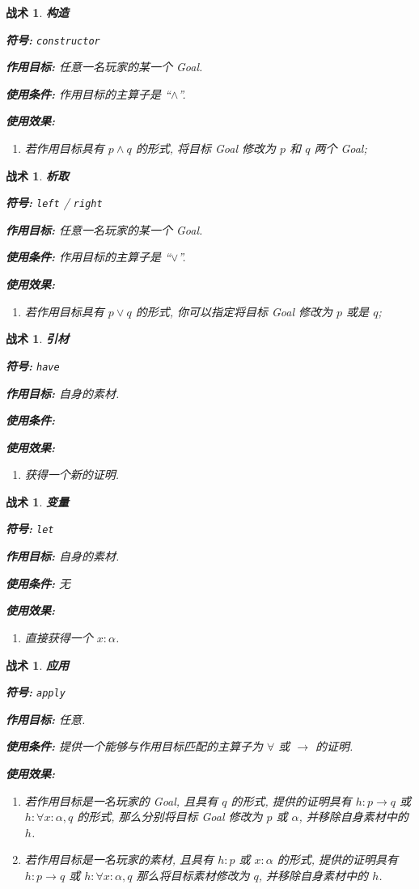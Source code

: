 \documentclass[UTF8]{ctexart}
\DeclareMathOperator{\0}{\mathbf{0}}                    %
\newcommand{\<}{\langle}
\renewcommand{\>}{\rangle}                              %
\newenvironment{thm_box}{
    \begin{tcolorbox}[enhanced, colback=thm_blue2, boxrule=0pt, frame hidden,
        borderline west={0.7mm}{0.1mm}{thm_blue1},breakable]
    }
    {\end{tcolorbox}}
\theoremstyle{MyStyle} %
\newtheorem{mytactic}[definition]{战术}
\newenvironment{tactic}[4]
{
    \begin{thm_box}
        \begin{mytactic}
            \textbf{#1}

            \textbf{符号: }#2

            \textbf{作用目标: }#3

            \textbf{使用条件: }#4

            \textbf{使用效果: }
}
{
        \end{mytactic}
    \end{thm_box}
}
\newcommand*{\lean}[1]{\texttt{\color{blue}#1}}
\begin{document}
        \begin{tactic}
            {构造}
            {\lean{constructor}}
            {任意一名玩家的某一个 Goal. }
            {作用目标的主算子是 ``$\land$''. }
            \begin{enumerate}
                \item 若作用目标具有 $p \land q$ 的形式, 将目标 Goal 修改为 $p$ 和 $q$ 两个 Goal; 
            \end{enumerate}
        \end{tactic}

        \begin{tactic}
            {析取}
            {\lean{left} / \lean{right}}
            {任意一名玩家的某一个 Goal. }
            {作用目标的主算子是 ``$\lor$''. }
            \begin{enumerate}
                \item 若作用目标具有 $p \lor q$ 的形式, 你可以指定将目标 Goal 修改为 $p$ 或是 $q$; 
            \end{enumerate}
        \end{tactic}

        \begin{tactic}
            {引材}
            {\lean{have}}
            {自身的素材. }
            {}
            \begin{enumerate}
                \item 获得一个新的证明. 
            \end{enumerate}
        \end{tactic}

        \begin{tactic}
            {变量}
            {\lean{let}}
            {自身的素材. }
            {无}
            \begin{enumerate}
                \item 直接获得一个 $x : \alpha$. 
            \end{enumerate}
        \end{tactic}

        \begin{tactic}
            {应用}
            {\lean{apply}}
            {任意. }
            {提供一个能够与作用目标匹配的主算子为 $\forall$ 或 $\to$ 的证明. }
            \begin{enumerate}
                \item 若作用目标是一名玩家的 Goal, 且具有 $q$ 的形式, 提供的证明具有 $h : p \to q$ 或 $h : \forall x : \alpha, q$ 的形式, 那么分别将目标 Goal 修改为 $p$ 或 $\alpha$, 并移除自身素材中的 $h$. 
                \item 若作用目标是一名玩家的素材, 且具有 $h : p$ 或 $x : \alpha$ 的形式, 提供的证明具有 $h : p \to q$ 或 $h : \forall x : \alpha, q$ 那么将目标素材修改为 $q$, 并移除自身素材中的 $h$. 
            \end{enumerate}
        \end{tactic}
\end{document}
